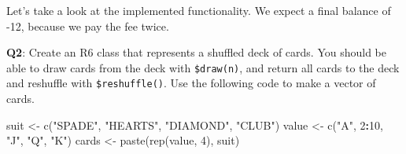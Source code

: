 \documentclass[
]{krantz}
\makeatletter
\newenvironment{Shaded}{\begin{snugshade}}{\end{snugshade}}
\newcommand{\CommentTok}[1]{\textcolor[rgb]{0.56,0.35,0.01}{\textit{#1}}}
\newcommand{\ControlFlowTok}[1]{\textcolor[rgb]{0.13,0.29,0.53}{\textbf{#1}}}
\newcommand{\DataTypeTok}[1]{\textcolor[rgb]{0.13,0.29,0.53}{#1}}
\newcommand{\DecValTok}[1]{\textcolor[rgb]{0.00,0.00,0.81}{#1}}
\newcommand{\KeywordTok}[1]{\textcolor[rgb]{0.13,0.29,0.53}{\textbf{#1}}}
\newcommand{\NormalTok}[1]{#1}
\newcommand{\OperatorTok}[1]{\textcolor[rgb]{0.81,0.36,0.00}{\textbf{#1}}}
\newcommand{\StringTok}[1]{\textcolor[rgb]{0.31,0.60,0.02}{#1}}
\newenvironment{kframe}{%
\medskip{}
\setlength{\fboxsep}{.8em}
 \def\at@end@of@kframe{}%
 \ifinner\ifhmode%
  \def\at@end@of@kframe{\end{minipage}}%
  \begin{minipage}{\columnwidth}%
 \fi\fi%
 \def\FrameCommand##1{\hskip\@totalleftmargin \hskip-\fboxsep
 \colorbox{shadecolor}{##1}\hskip-\fboxsep
     \hskip-\linewidth \hskip-\@totalleftmargin \hskip\columnwidth}%
 \MakeFramed {\advance\hsize-\width
   \@totalleftmargin\z@ \linewidth\hsize
   \@setminipage}}%
 {\par\unskip\endMakeFramed%
 \at@end@of@kframe}
\renewenvironment{Shaded}{\begin{kframe}}{\end{kframe}}
\renewcommand{\KeywordTok} [1]{\textcolor[rgb]{0.00,0.44,0.13}{{#1}}}
\renewcommand{\DataTypeTok}[1]{\textcolor[rgb]{0.56,0.13,0.00}{{#1}}}
\renewcommand{\DecValTok}  [1]{\textcolor[rgb]{0.25,0.63,0.44}{{#1}}}
\renewcommand{\StringTok}  [1]{\textcolor[rgb]{0.25,0.44,0.63}{{#1}}}
\renewcommand{\CommentTok} [1]{\textcolor[rgb]{0.38,0.63,0.69}{{#1}}}
\renewcommand{\NormalTok}  [1]{{#1}}
\makeatother
\begin{document}
\begin{Shaded}
\end{Shaded}

Let's take a look at the implemented functionality. We expect a final balance of -12, because we pay the fee twice.

\begin{Shaded}
\end{Shaded}

\textbf{{Q2}}: Create an R6 class that represents a shuffled deck of cards. You should be able to draw cards from the deck with \texttt{\$draw(n)}, and return all cards to the deck and reshuffle with \texttt{\$reshuffle()}. Use the following code to make a vector of cards.

\begin{Shaded}
\begin{Highlighting}[]
\NormalTok{suit <-}\StringTok{ }\KeywordTok{c}\NormalTok{(}\StringTok{"SPADE"}\NormalTok{, }\StringTok{"HEARTS"}\NormalTok{, }\StringTok{"DIAMOND"}\NormalTok{, }\StringTok{"CLUB"}\NormalTok{)}
\NormalTok{value <-}\StringTok{ }\KeywordTok{c}\NormalTok{(}\StringTok{"A"}\NormalTok{, }\DecValTok{2}\OperatorTok{:}\DecValTok{10}\NormalTok{, }\StringTok{"J"}\NormalTok{, }\StringTok{"Q"}\NormalTok{, }\StringTok{"K"}\NormalTok{)}
\NormalTok{cards <-}\StringTok{ }\KeywordTok{paste}\NormalTok{(}\KeywordTok{rep}\NormalTok{(value, }\DecValTok{4}\NormalTok{), suit)}
\end{Highlighting}
\end{Shaded}
\end{document}
